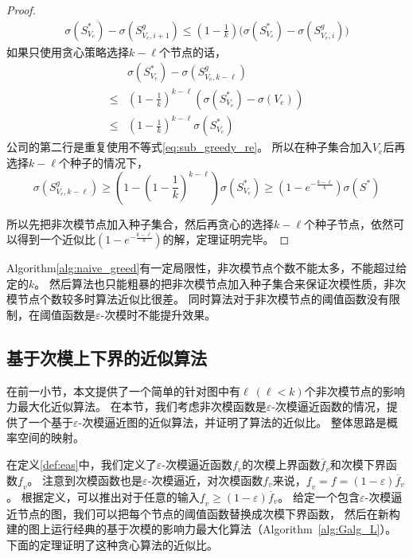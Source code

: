 \begin{proof}
\begin{equation*}
\begin{array}{ll}
\sigma(S^*_{V_e}) - \sigma(S^g_{V_e,i+1}) \leq
(1-\frac{1}{k}) \big( \sigma(S^*_{V_e}) - \sigma(S^g_{V_e,i}) \big)
\end{array}
\end{equation*}
如果只使用贪心策略选择$k-\ell$个节点的话，
\begin{equation*}
\begin{array}{ll}
& \sigma(S^*_{V_e}) - \sigma(S^g_{V_e,k-\ell}) \\
\leq & (1-\frac{1}{k})^{k-\ell} (\sigma(S^*_{V_e}) - \sigma(V_e))\\
\leq & (1-\frac{1}{k})^{k-\ell} \sigma(S^*_{V_e})
\end{array}
\end{equation*}
公司的第二行是重复使用不等式\ref{eq:sub_greedy_re}。
所以在种子集合加入$V_e$后再选择$k-\ell$个种子的情况下，
$$\sigma(S^g_{V_e,k-\ell})
\geq (1-(1-\frac{1}{k})^{k-\ell}) \sigma(S^*_{V_e})
\geq (1-e^{-\frac{k-\ell}{k}}) \sigma(S^*)$$

所以先把非次模节点加入种子集合，然后再贪心的选择$k-\ell$个种子节点，依然可以得到一个近似比$(1-e^{-\frac{k-\ell}{k}})$的解，定理证明完毕。
\end{proof}

Algorithm\ref{alg:naive_greed}有一定局限性，非次模节点个数不能太多，不能超过给定的$k$。
然后算法也只能粗暴的把非次模节点加入种子集合来保证次模性质，非次模节点个数较多时算法近似比很差。
同时算法对于非次模节点的阈值函数没有限制，在阈值函数是$\varepsilon$-次模时不能提升效果。

\subsection{基于次模上下界的近似算法}
在前一小节，本文提供了一个简单的针对图中有$\ell~(\ell<k)$个非次模节点的影响力最大化近似算法。
在本节，我们考虑非次模函数是$\varepsilon$-次模逼近函数的情况，提供了一个基于$\varepsilon$-次模逼近图的近似算法，并证明了算法的近似比。
整体思路是概率空间的映射。

在定义\ref{def:eas}中，我们定义了$\varepsilon$-次模逼近函数$f_v$的次模上界函数$\overline{f}_v$和次模下界函数$\underline{f}_v$。
注意到次模函数也是$\varepsilon$-次模逼近，对次模函数$f_v$来说，$\underline{f}_v = f = (1-\varepsilon)\overline{f}_v$。
根据定义，可以推出对于任意的输入$\underline{f}_v \geq (1-\varepsilon)\overline{f}_v$。
给定一个包含$\varepsilon$-次模逼近节点的图，我们可以把每个节点的阈值函数替换成次模下界函数，
然后在新构建的图上运行经典的基于次模的影响力最大化算法（Algorithm~\ref{alg:Galg_L}）。
下面的定理证明了这种贪心算法的近似比。

